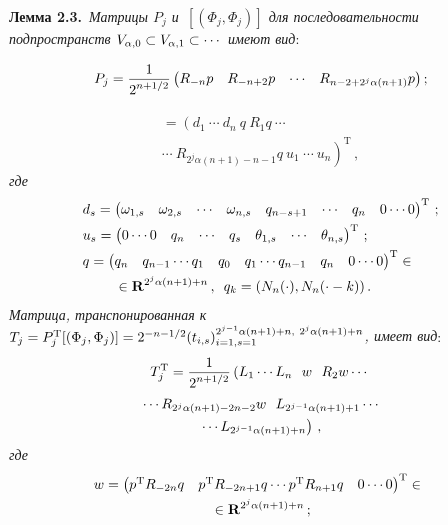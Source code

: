 \begin{multicols}{2}

\noindent
\textbf{Лемма 2.3.}\ 
\textit{Матрицы ${P}_j$ и~$[(\Phi_j,\Phi_j)]$ 
для последовательности подпространств  $V_{\alpha,0}\hm\subset V_{\alpha,1}
\subset\cdots$ имеют вид}:

\pagebreak

\noindent
\begin{equation*}
{P}_j=\displaystyle\frac{\displaystyle 1\mathstrut}{\displaystyle 2^{n+{1}/{2}}\mathstrut}
\begin{pmatrix} 
R_{-n}{p}&R_{-n+2}{p}&\cdots&R_{n-2+2^j\alpha (n+1)}{p}
\end{pmatrix};
\end{equation*}

\vspace*{-12pt}

\noindent
\begin{multline*}
[(\Phi_j,\Phi_j)]=\left( 
{d}_1\  \cdots\  {d}_n\ {q}\ 
R_1{q}\ \cdots\right.\\
\left.\cdots  \ R_{2^j\alpha (n+1)-n-1}
{q}\ {u}_1\ \cdots\ {u}_n\right)^{\mathrm{T}}\,,
\end{multline*}
\textit{где }
\begin{align*}
&{d}_s=
\begin{pmatrix} \omega_{1,s}&\omega_{2,s}&\cdots&\omega_{n,s}&q_{n-s+1}&\cdots&
q_n&0 \cdots 0\end{pmatrix}^{\mathrm{T}}\,;
\\
&{u}_s=
\begin{pmatrix}0 \cdots 0&q_n&\cdots&q_s&\theta_{1,s}&\cdots&\theta_{n,s}\end{pmatrix}^{\mathrm{T}}\,;\\
&{q}=
\begin{pmatrix} q_n & q_{n-1}  \cdots  q_1 & q_0 & q_1  \cdots  q_{n-1} & q_n &
 0 \cdots 0 \end{pmatrix}^{\mathrm{T}}   \in{}\\
& \hspace*{8mm}{}\in  \mathbf{R}^{2^j\alpha (n+1)+n}\,,
 \enskip q_{k} =\left(N_{n}(\cdot),N_{n} (\cdot -k)\right).
\end{align*}
\textit{Матрица, транспонированная к~${T}_j\hm={P}_j^{\mathrm{T}}
 [(\Phi_j,\Phi_j)]\hm=2^{-n-{1}/{2}}
 (t_{i,s})_{i=1,s=1}^{2^{j-1}\alpha (n+1)+n,~2^j\alpha (n+1)+n}$,
имеет вид}:
\begin{multline*}
{T}_j^{\mathrm{T}}=\displaystyle\frac{\displaystyle 1\mathstrut}{\displaystyle 2^{n+{1}/{2}}\mathstrut}
\left( 
{L}_1 \cdots {L}_n\  \  {w}\ \  R_2 {w} \cdots \right.\\
\cdots
R_{2^j\alpha (n+1)-2n-2} {w}\ \  {L}_{2^{j-1}\alpha (n+1)+1} \cdots \\
\left.\cdots {L}_{2^{j-1}\alpha (n+1)+n}\right)\,,
\end{multline*}
\textit{где} 
\begin{multline*}
\hspace*{-2pt}{w}=\begin{pmatrix}
{p}^{\mathrm{T}} R_{-2n}{q}&{p}^{\mathrm{T}} R_{-2n+1}{q} 
\cdots {p}^{\mathrm{T}} R_{n+1}{q}&0 \cdots 0 
\end{pmatrix}^{\mathrm{T}}
 \in{}\\
 {}\in \mathbf{R}^{2^j\alpha (n+1)+n}\,;
\end{multline*}


\end{multicols}

